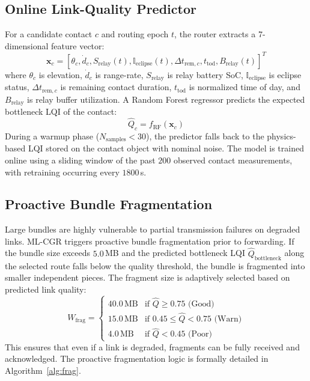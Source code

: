 \documentclass[a4paper,fleqn]{cas-dc}
\newcommand{\mlcgr}{\textsf{ML-CGR}}
\begin{document}
\subsection{Online Link-Quality Predictor}
For a candidate contact $c$ and routing epoch $t$, the router extracts a 7-dimensional feature vector:
\begin{equation}
    \mathbf{x}_c = [ \theta_c, \dot{d}_c, S_{\text{relay}}(t), \mathbb{I}_{\text{eclipse}}(t), \Delta t_{\text{rem},c}, t_{\text{tod}}, B_{\text{relay}}(t) ]^T
\end{equation}
where $\theta_c$ is elevation, $\dot{d}_c$ is range-rate, $S_{\text{relay}}$ is relay battery SoC, $\mathbb{I}_{\text{eclipse}}$ is eclipse status, $\Delta t_{\text{rem},c}$ is remaining contact duration, $t_{\text{tod}}$ is normalized time of day, and $B_{\text{relay}}$ is relay buffer utilization. A Random Forest regressor predicts the expected bottleneck LQI of the contact:
\begin{equation}
    \hat{Q}_c = f_{\text{RF}}(\mathbf{x}_c)
\end{equation}
During a warmup phase ($N_{\text{samples}} < 30$), the predictor falls back to the physics-based LQI stored on the contact object with nominal noise. The model is trained online using a sliding window of the past $200$ observed contact measurements, with retraining occurring every $1800\,$s.

\subsection{Proactive Bundle Fragmentation}
Large bundles are highly vulnerable to partial transmission failures on degraded links. \mlcgr{} triggers proactive bundle fragmentation prior to forwarding.
If the bundle size exceeds $5.0\,$MB and the predicted bottleneck LQI $\hat{Q}_{\text{bottleneck}}$ along the selected route falls below the quality threshold, the bundle is fragmented into smaller independent pieces. The fragment size is adaptively selected based on predicted link quality:
\begin{equation}
    W_{\text{frag}} = \begin{cases} 
        40.0\,\text{MB} & \text{if } \hat{Q} \ge 0.75 \text{ (Good)} \\
        15.0\,\text{MB} & \text{if } 0.45 \le \hat{Q} < 0.75 \text{ (Warn)} \\
        4.0\,\text{MB} & \text{if } \hat{Q} < 0.45 \text{ (Poor)}
    \end{cases}
\end{equation}
This ensures that even if a link is degraded, fragments can be fully received and acknowledged. The proactive fragmentation logic is formally detailed in Algorithm~\ref{alg:frag}.
\end{document}
